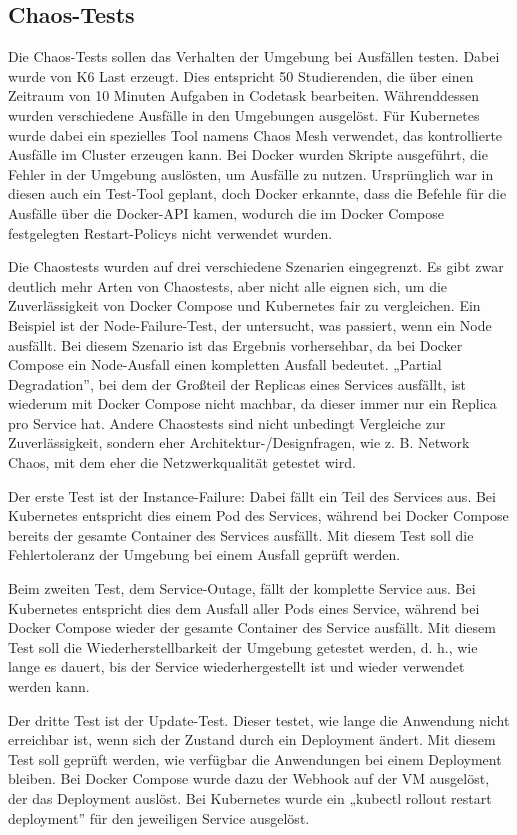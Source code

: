 \subsection{Chaos-Tests}
Die Chaos-Tests sollen das Verhalten der Umgebung bei Ausfällen testen.
Dabei wurde von K6 Last erzeugt. Dies entspricht 50 Studierenden, die über einen Zeitraum von 10 Minuten Aufgaben in Codetask bearbeiten.
Währenddessen wurden verschiedene Ausfälle in den Umgebungen ausgelöst.
Für Kubernetes wurde dabei ein spezielles Tool namens Chaos Mesh verwendet, das kontrollierte Ausfälle im Cluster erzeugen kann.
Bei Docker wurden Skripte ausgeführt, die Fehler in der Umgebung auslösten, um Ausfälle zu nutzen. 
Ursprünglich war in diesen auch ein Test-Tool geplant, doch Docker erkannte, dass die Befehle für die Ausfälle über die Docker-API kamen, wodurch die im Docker Compose festgelegten Restart-Policys nicht verwendet wurden.

Die Chaostests wurden auf drei verschiedene Szenarien eingegrenzt.
Es gibt zwar deutlich mehr Arten von Chaostests, aber nicht alle eignen sich, um die Zuverlässigkeit von Docker Compose und Kubernetes fair zu vergleichen.
Ein Beispiel ist der Node-Failure-Test, der untersucht, was passiert, wenn ein Node ausfällt. Bei diesem Szenario ist das Ergebnis vorhersehbar, da bei Docker Compose ein Node-Ausfall einen kompletten Ausfall bedeutet.
„Partial Degradation”, bei dem der Großteil der Replicas eines Services ausfällt, ist wiederum mit Docker Compose nicht machbar, da dieser immer nur ein Replica pro Service hat.
Andere Chaostests sind nicht unbedingt Vergleiche zur Zuverlässigkeit, sondern eher Architektur-/Designfragen, wie z. B. Network Chaos, mit dem eher die Netzwerkqualität getestet wird.

Der erste Test ist der Instance-Failure: Dabei fällt ein Teil des Services aus. Bei Kubernetes entspricht dies einem Pod des Services, während bei Docker Compose bereits der gesamte Container des Services ausfällt.
Mit diesem Test soll die Fehlertoleranz der Umgebung bei einem Ausfall geprüft werden.

Beim zweiten Test, dem Service-Outage, fällt der komplette Service aus. Bei Kubernetes entspricht dies dem Ausfall aller Pods eines Service, während bei Docker Compose wieder der gesamte Container des Service ausfällt.
Mit diesem Test soll die Wiederherstellbarkeit der Umgebung getestet werden, d. h., wie lange es dauert, bis der Service wiederhergestellt ist und wieder verwendet werden kann.

Der dritte Test ist der Update-Test. Dieser testet, wie lange die Anwendung nicht erreichbar ist, wenn sich der Zustand durch ein Deployment ändert.
Mit diesem Test soll geprüft werden, wie verfügbar die Anwendungen bei einem Deployment bleiben. Bei Docker Compose wurde dazu der Webhook auf der VM ausgelöst, der das Deployment auslöst.
Bei Kubernetes wurde ein „kubectl rollout restart deployment” für den jeweiligen Service ausgelöst.

